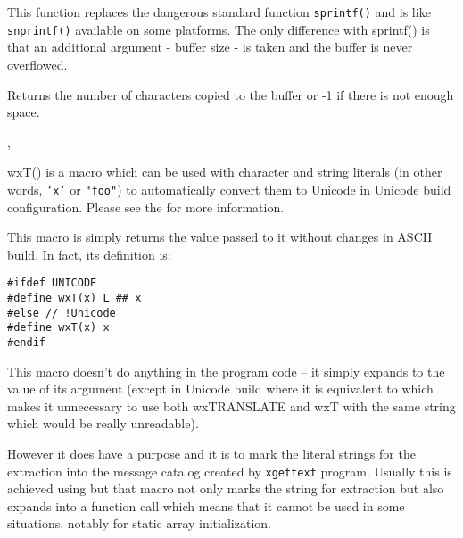 \label{wxsnprintf}


This function replaces the dangerous standard function {\tt sprintf()} and is
like {\tt snprintf()} available on some platforms. The only difference with
sprintf() is that an additional argument - buffer size - is taken and the
buffer is never overflowed.

Returns the number of characters copied to the buffer or -1 if there is not
enough space.


, 


\label{wxt}



wxT() is a macro which can be used with character and string literals (in other
words, {\tt 'x'} or {\tt "foo"}) to automatically convert them to Unicode in
Unicode build configuration. Please see the
 for more information.

This macro is simply returns the value passed to it without changes in ASCII
build. In fact, its definition is:
\begin{verbatim}
#ifdef UNICODE
#define wxT(x) L ## x
#else // !Unicode
#define wxT(x) x
#endif
\end{verbatim}


\label{wxtranslate}


This macro doesn't do anything in the program code -- it simply expands to the
value of its argument (except in Unicode build where it is equivalent to
 which makes it unnecessary to use both wxTRANSLATE and wxT
with the same string which would be really unreadable).

However it does have a purpose and it is to mark the literal strings for the
extraction into the message catalog created by {\tt xgettext} program. Usually
this is achieved using  but that macro not only marks
the string for extraction but also expands into a
 function call which means that it
cannot be used in some situations, notably for static array
initialization.

